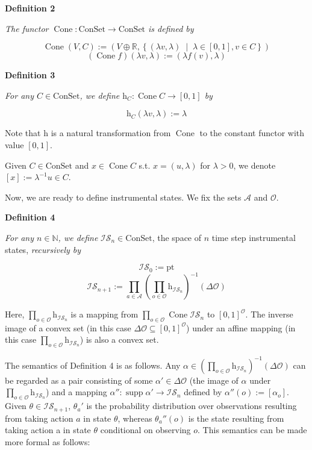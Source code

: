 \documentclass[a4paper]{article}
\newcommand{\Co}[1]{}
\DeclareMathOperator{\Supp}{supp}
\newcommand{\AP}[1]{\left(#1\right)}
\newcommand{\AB}[1]{\left[#1\right]}
\newcommand{\ACM}[2]{\left\{#1\;\middle\vert\;#2\right\}}
\newcommand{\Nats}{\mathbb{N}}
\newcommand{\Reals}{\mathbb{R}}
\newcommand{\Pt}{\boldsymbol{\mathrm{pt}}}
\newcommand{\A}{\mathcal{A}}
\newcommand{\Ob}{\mathcal{O}}
\newcommand{\Con}{\boldsymbol{\mathrm{ConSet}}}
\DeclareMathOperator{\Cone}{Cone}
\newcommand{\Ht}{\mathrm{h}}
\newcommand{\IS}{\mathcal{IS}}
\begin{document}
\textbf{Definition 2}\Co{b}

\textit{The functor $\Cone:\Con\rightarrow\Con$ is defined by}\Co{i}

$$\Cone{(V,C)}:=\AP{V\oplus\Reals,\ACM{(\lambda v,\lambda)}{\lambda\in[0,1], v\in C}}$$
$$\AP{\Cone{f}}(\lambda v, \lambda):=\AP{\lambda f(v), \lambda}$$

\textbf{Definition 3}\Co{b}

\textit{For any $C\in\Con$, we define $\Ht_{C}:\Cone{C}\rightarrow[0,1]$ by}\Co{i}

$$\Ht_{C}(\lambda v, \lambda):=\lambda$$

Note that $\Ht$ is a natural transformation from $\Cone$ to the constant functor with value $[0,1]$.

Given $C\in\Con$ and $x\in \Cone C$ s.t. $x=(u,\lambda)$ for $\lambda > 0$, we denote $[x]:=\lambda^{-1}u\in C$.

Now, we are ready to define instrumental states. We fix the sets $\A$ and $\Ob$.

\textbf{Definition 4}\Co{b}

\textit{For any $n\in\Nats$, we define} $\IS_n\in\Con$, the space of $n$ time step instrumental states, \textit{recursively by}

$$\IS_0:=\Pt$$
$$\IS_{n+1}:=\prod_{a\in\A}\AP{\prod_{o\in\Ob}\Ht_{\IS_n}}^{-1}(\Delta\Ob)$$

Here, $\prod_{o\in\Ob}\Ht_{\IS_n}$ is a mapping from $\prod_{o\in\Ob}\Cone\IS_n$ to $[0,1]^\Ob$. The inverse image of a convex set (in this case $\Delta\Ob\subseteq[0,1]^\Ob$) under an affine mapping (in this case $\prod_{o\in\Ob}\Ht_{\IS_n}$) is also a convex set.

The semantics of Definition 4 is as follows. Any $\alpha\in\AP{\prod_{o\in\Ob}\Ht_{\IS_n}}^{-1}(\Delta\Ob)$ can be regarded as a pair consisting of some $\alpha'\in\Delta\Ob$ (the image of $\alpha$ under $\prod_{o\in\Ob}\Ht_{\IS_n}$) and a mapping $\alpha'':\Supp{\alpha'}\rightarrow\IS_n$ defined by $\alpha''(o):=\AB{\alpha_o}$. Given $\theta\in\IS_{n+1}$, $\theta_{a}'$ is the probability distribution over observations resulting from taking action $a$ in state $\theta$, whereas $\theta_{a}''(o)$ is the state resulting from taking action a in state $\theta$ conditional on observing $o$. This semantics can be made more formal as follows:

\Co{In the following, we will use the notation $\theta\mid a$ instead of $\theta_a$ and $\theta\mid ao$ instead of $\theta_{a1}(o)$.}
\end{document}
